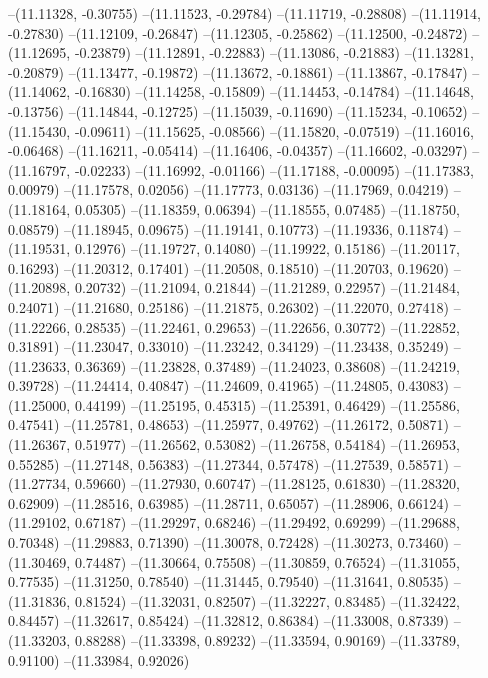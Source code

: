 --(11.11328, -0.30755)
--(11.11523, -0.29784)
--(11.11719, -0.28808)
--(11.11914, -0.27830)
--(11.12109, -0.26847)
--(11.12305, -0.25862)
--(11.12500, -0.24872)
--(11.12695, -0.23879)
--(11.12891, -0.22883)
--(11.13086, -0.21883)
--(11.13281, -0.20879)
--(11.13477, -0.19872)
--(11.13672, -0.18861)
--(11.13867, -0.17847)
--(11.14062, -0.16830)
--(11.14258, -0.15809)
--(11.14453, -0.14784)
--(11.14648, -0.13756)
--(11.14844, -0.12725)
--(11.15039, -0.11690)
--(11.15234, -0.10652)
--(11.15430, -0.09611)
--(11.15625, -0.08566)
--(11.15820, -0.07519)
--(11.16016, -0.06468)
--(11.16211, -0.05414)
--(11.16406, -0.04357)
--(11.16602, -0.03297)
--(11.16797, -0.02233)
--(11.16992, -0.01166)
--(11.17188, -0.00095)
--(11.17383, 0.00979)
--(11.17578, 0.02056)
--(11.17773, 0.03136)
--(11.17969, 0.04219)
--(11.18164, 0.05305)
--(11.18359, 0.06394)
--(11.18555, 0.07485)
--(11.18750, 0.08579)
--(11.18945, 0.09675)
--(11.19141, 0.10773)
--(11.19336, 0.11874)
--(11.19531, 0.12976)
--(11.19727, 0.14080)
--(11.19922, 0.15186)
--(11.20117, 0.16293)
--(11.20312, 0.17401)
--(11.20508, 0.18510)
--(11.20703, 0.19620)
--(11.20898, 0.20732)
--(11.21094, 0.21844)
--(11.21289, 0.22957)
--(11.21484, 0.24071)
--(11.21680, 0.25186)
--(11.21875, 0.26302)
--(11.22070, 0.27418)
--(11.22266, 0.28535)
--(11.22461, 0.29653)
--(11.22656, 0.30772)
--(11.22852, 0.31891)
--(11.23047, 0.33010)
--(11.23242, 0.34129)
--(11.23438, 0.35249)
--(11.23633, 0.36369)
--(11.23828, 0.37489)
--(11.24023, 0.38608)
--(11.24219, 0.39728)
--(11.24414, 0.40847)
--(11.24609, 0.41965)
--(11.24805, 0.43083)
--(11.25000, 0.44199)
--(11.25195, 0.45315)
--(11.25391, 0.46429)
--(11.25586, 0.47541)
--(11.25781, 0.48653)
--(11.25977, 0.49762)
--(11.26172, 0.50871)
--(11.26367, 0.51977)
--(11.26562, 0.53082)
--(11.26758, 0.54184)
--(11.26953, 0.55285)
--(11.27148, 0.56383)
--(11.27344, 0.57478)
--(11.27539, 0.58571)
--(11.27734, 0.59660)
--(11.27930, 0.60747)
--(11.28125, 0.61830)
--(11.28320, 0.62909)
--(11.28516, 0.63985)
--(11.28711, 0.65057)
--(11.28906, 0.66124)
--(11.29102, 0.67187)
--(11.29297, 0.68246)
--(11.29492, 0.69299)
--(11.29688, 0.70348)
--(11.29883, 0.71390)
--(11.30078, 0.72428)
--(11.30273, 0.73460)
--(11.30469, 0.74487)
--(11.30664, 0.75508)
--(11.30859, 0.76524)
--(11.31055, 0.77535)
--(11.31250, 0.78540)
--(11.31445, 0.79540)
--(11.31641, 0.80535)
--(11.31836, 0.81524)
--(11.32031, 0.82507)
--(11.32227, 0.83485)
--(11.32422, 0.84457)
--(11.32617, 0.85424)
--(11.32812, 0.86384)
--(11.33008, 0.87339)
--(11.33203, 0.88288)
--(11.33398, 0.89232)
--(11.33594, 0.90169)
--(11.33789, 0.91100)
--(11.33984, 0.92026)
